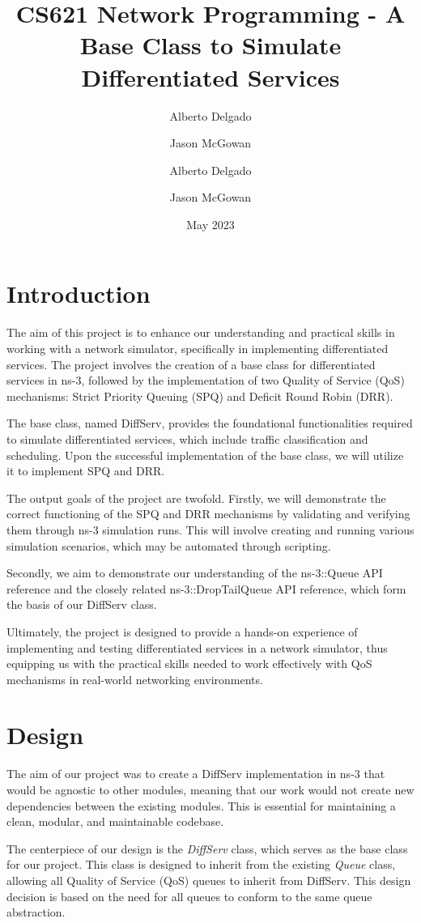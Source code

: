 \documentclass{article}
\title{\bfseries CS621 Network Programming - A Base Class to Simulate Differentiated Services}
\author{Alberto Delgado}
\author {Jason McGowan}
\author{Alberto Delgado \and Jason McGowan}
\date{May 2023}
\begin{document}
\maketitle

\section{Introduction}
The aim of this project is to enhance our understanding and practical skills in working with a network simulator, specifically in implementing differentiated services. The project involves the creation of a base class for differentiated services in ns-3, followed by the implementation of two Quality of Service (QoS) mechanisms: Strict Priority Queuing (SPQ) and Deficit Round Robin (DRR). 

The base class, named DiffServ, provides the foundational functionalities required to simulate differentiated services, which include traffic classification and scheduling. Upon the successful implementation of the base class, we will utilize it to implement SPQ and DRR. 

The output goals of the project are twofold. Firstly, we will demonstrate the correct functioning of the SPQ and DRR mechanisms by validating and verifying them through ns-3 simulation runs. This will involve creating and running various simulation scenarios, which may be automated through scripting. 

Secondly, we aim to demonstrate our understanding of the ns-3::Queue API reference and the closely related ns-3::DropTailQueue API reference, which form the basis of our DiffServ class.

Ultimately, the project is designed to provide a hands-on experience of implementing and testing differentiated services in a network simulator, thus equipping us with the practical skills needed to work effectively with QoS mechanisms in real-world networking environments.

\section{Design}

The aim of our project was to create a DiffServ implementation in ns-3 that would be agnostic to other modules, meaning that our work would not create new dependencies between the existing modules. This is essential for maintaining a clean, modular, and maintainable codebase.

The centerpiece of our design is the \textit{DiffServ} class, which serves as the base class for our project. This class is designed to inherit from the existing \textit{Queue} class, allowing all Quality of Service (QoS) queues to inherit from DiffServ. This design decision is based on the need for all queues to conform to the same queue abstraction.
\end{document}

